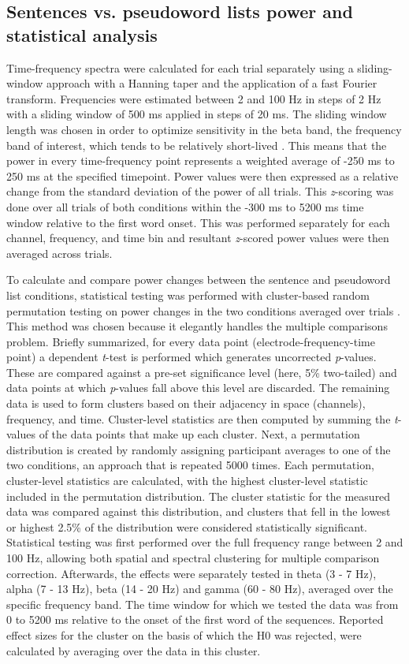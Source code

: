 \subsection{Sentences vs. pseudoword lists power and statistical analysis}
Time-frequency spectra were calculated for each trial separately using a sliding-window approach with a Hanning taper and the application of a fast Fourier transform. Frequencies were estimated between 2 and 100 Hz in steps of 2 Hz with a sliding window of 500 ms applied in steps of 20 ms. The sliding window length was chosen in order to optimize sensitivity in the beta band, the frequency band of interest, which tends to be relatively short-lived \citep{jones2016}. This means that the power in every time-frequency point represents a weighted average of -250 ms to 250 ms at the specified timepoint. Power values were then expressed as a relative change from the standard deviation of the power of all trials. This \textit{z}-scoring was done over all trials of both conditions within the -300 ms to 5200 ms time window relative to the first word onset. This was performed separately for each channel, frequency, and time bin and resultant \textit{z}-scored power values were then averaged across trials. 

To calculate and compare power changes between the sentence and pseudoword list conditions, statistical testing was performed with cluster-based random permutation testing on power changes in the two conditions averaged over trials \citep{maris2007}. This method was chosen because it elegantly handles the multiple comparisons problem. Briefly summarized, for every data point (electrode-frequency-time point) a dependent \textit{t}-test is performed which generates uncorrected \textit{p}-values. These are compared against a pre-set significance level (here, 5\% two-tailed) and data points at which \textit{p}-values fall above this level are discarded. The remaining data is used to form clusters based on their adjacency in space (channels), frequency, and time. Cluster-level statistics are then computed by summing the \textit{t}-values of the data points that make up each cluster. Next, a permutation distribution is created by randomly assigning participant averages to one of the two conditions, an approach that is repeated 5000 times. Each permutation, cluster-level statistics are calculated, with the highest cluster-level statistic included in the permutation distribution. The cluster statistic for the measured data was compared against this distribution, and clusters that fell in the lowest or highest 2.5\% of the distribution were considered statistically significant. Statistical testing was first performed over the full frequency range between 2 and 100 Hz, allowing both spatial and spectral clustering for multiple comparison correction. Afterwards, the effects were separately tested in theta (3 - 7 Hz), alpha (7 - 13 Hz), beta (14 - 20 Hz) and gamma (60 - 80 Hz), averaged over the specific frequency band. The time window for which we tested the data was from 0 to 5200 ms relative to the onset of the first word of the sequences. Reported effect sizes for the cluster on the basis of which the H0 was rejected, were calculated by averaging over the data in this cluster. 

